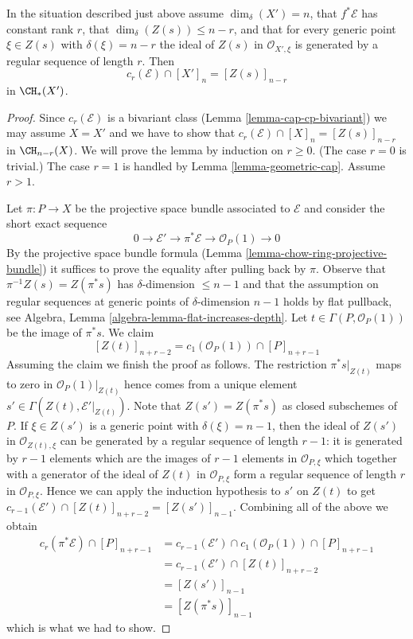 \begin{lemma}
\label{lemma-top-chern-class}
In the situation described just above assume $\dim_\delta(X') = n$,
that $f^*\mathcal{E}$ has constant rank $r$, that
$\dim_\delta(Z(s)) \leq n - r$, and that for every generic point
$\xi \in Z(s)$ with $\delta(\xi) = n - r$ the ideal of $Z(s)$
in $\mathcal{O}_{X', \xi}$ is generated by a regular sequence
of length $r$. Then
$$
c_r(\mathcal{E}) \cap [X']_n = [Z(s)]_{n - r}
$$
in $\CH_*(X')$.
\end{lemma}

\begin{proof}
Since $c_r(\mathcal{E})$ is a bivariant class
(Lemma \ref{lemma-cap-cp-bivariant})
we may assume $X = X'$ and we have to show that
$c_r(\mathcal{E}) \cap [X]_n = [Z(s)]_{n - r}$ in $\CH_{n - r}(X)$.
We will prove the lemma by induction on $r \geq 0$. (The case
$r = 0$ is trivial.) The case $r = 1$
is handled by Lemma \ref{lemma-geometric-cap}. Assume $r > 1$.

\medskip\noindent
Let $\pi : P \to X$ be the projective space bundle associated to
$\mathcal{E}$ and consider the short exact sequence
$$
0 \to \mathcal{E}' \to \pi^*\mathcal{E} \to \mathcal{O}_P(1) \to 0
$$
By the projective space bundle formula
(Lemma \ref{lemma-chow-ring-projective-bundle})
it suffices to prove the equality after pulling back by $\pi$.
Observe that $\pi^{-1}Z(s) = Z(\pi^*s)$ has $\delta$-dimension
$\leq n - 1$ and that the assumption on regular sequences at
generic points of $\delta$-dimension $n - 1$ holds by
flat pullback, see
Algebra, Lemma \ref{algebra-lemma-flat-increases-depth}.
Let $t \in \Gamma(P, \mathcal{O}_P(1))$ be the image of $\pi^*s$.
We claim
$$
[Z(t)]_{n + r - 2} = c_1(\mathcal{O}_P(1)) \cap [P]_{n + r - 1}
$$
Assuming the claim we finish the proof as follows.
The restriction $\pi^*s|_{Z(t)}$ maps to zero in
$\mathcal{O}_P(1)|_{Z(t)}$ hence comes from a unique
element $s' \in \Gamma(Z(t), \mathcal{E}'|_{Z(t)})$.
Note that $Z(s') = Z(\pi^*s)$ as closed subschemes of $P$.
If $\xi \in Z(s')$ is a generic point with $\delta(\xi) = n - 1$,
then the ideal of $Z(s')$ in $\mathcal{O}_{Z(t), \xi}$
can be generated by a regular sequence of length $r - 1$: it is generated by
$r - 1$ elements which are the images of $r - 1$ elements in
$\mathcal{O}_{P, \xi}$ which together with a generator of the
ideal of $Z(t)$ in $\mathcal{O}_{P, \xi}$ form a regular sequence
of length $r$ in $\mathcal{O}_{P, \xi}$. Hence we can apply the
induction hypothesis to $s'$ on $Z(t)$ to get
$c_{r - 1}(\mathcal{E}') \cap [Z(t)]_{n + r - 2} = [Z(s')]_{n - 1}$.
Combining all of the above we obtain
\begin{align*}
c_r(\pi^*\mathcal{E}) \cap [P]_{n + r - 1}
& =
c_{r - 1}(\mathcal{E}') \cap c_1(\mathcal{O}_P(1)) \cap [P]_{n + r - 1} \\
& =
c_{r - 1}(\mathcal{E}') \cap [Z(t)]_{n + r - 2} \\
& =
[Z(s')]_{n - 1} \\
& = [Z(\pi^*s)]_{n - 1}
\end{align*}
which is what we had to show.


\end{proof}
